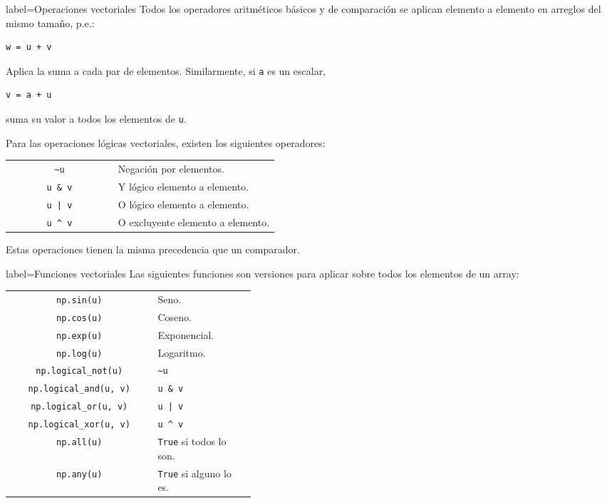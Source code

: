 \begin{contentbox}{label=Operaciones vectoriales}
    Todos los operadores aritméticos básicos y de comparación se aplican elemento a elemento en arreglos del mismo tamaño, p.e.:
\begin{lstlisting}
w = u + v
\end{lstlisting}
    Aplica la suma a cada par de elementos. Similarmente, si \lstinline!a! es un escalar,
\begin{lstlisting}
v = a + u
\end{lstlisting}
    suma su valor a todos los elementos de \lstinline!u!.
    
    Para las operaciones lógicas vectoriales, existen los siguientes operadores:
    
    \begin{tabular}{C|p{0.6\linewidth}}
        \lstinline!~u! & Negación por elementos. \\
        \lstinline!u & v! & Y lógico elemento a elemento. \\
        \lstinline!u | v! & O lógico elemento a elemento. \\
        \lstinline!u ^ v! & O excluyente elemento a elemento. \\
    \end{tabular}
    
    Estas operaciones tienen la misma precedencia que un comparador.
\end{contentbox}

\begin{contentbox}{label=Funciones vectoriales}
    Las siguientes funciones son versiones para aplicar sobre todos los elementos de un array:
    
    \begin{tabular}{C|p{0.4\linewidth}}
        \lstinline!np.sin(u)! & Seno. \\
        \lstinline!np.cos(u)! & Coseno. \\
        \lstinline!np.exp(u)! & Exponencial. \\
        \lstinline!np.log(u)! & Logaritmo. \\
        \lstinline!np.logical_not(u)! & \lstinline!~u! \\
        \lstinline!np.logical_and(u, v)! & \lstinline!u & v! \\
        \lstinline!np.logical_or(u, v)! & \lstinline!u | v! \\
        \lstinline!np.logical_xor(u, v)! & \lstinline!u ^ v! \\
        \lstinline!np.all(u)! & \lstinline!True! si todos lo son. \\
        \lstinline!np.any(u)! & \lstinline!True! si alguno lo es. \\
    \end{tabular}
    
\end{contentbox}

